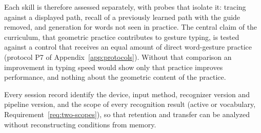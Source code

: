Each skill is therefore assessed separately, with probes that isolate it: tracing against a displayed path, recall of a previously learned path with the guide removed, and generation for words not seen in practice. The central claim of the curriculum, that geometric practice contributes to gesture typing, is tested against a control that receives an equal amount of direct word-gesture practice (protocol P7 of Appendix~\ref{app:protocols}). Without that comparison an improvement in typing speed would show only that practice improves performance, and nothing about the geometric content of the practice.

\begin{requirement}\label{req:transfer-records}
Every session record \must{} identify the device, input method, recognizer version and pipeline version, and the scope of every recognition result (active or vocabulary, Requirement~\ref{req:two-scopes}), so that retention and transfer can be analyzed without reconstructing conditions from memory.\evS
\end{requirement}
